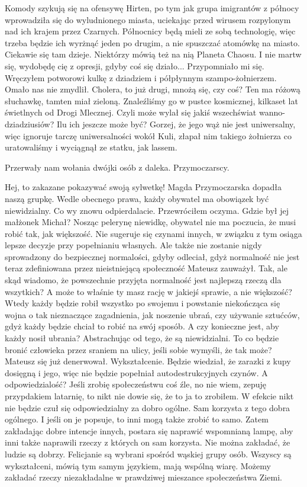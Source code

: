 \begin{dialogue}
Komody szykują się na ofensywę Hirten, po tym jak grupa imigrantów z północy wprowadziła się do wyludnionego miasta, uciekając przed wirusem rozpylonym nad ich krajem przez Czarnych.
Północnicy będą mieli ze sobą technologię, więc trzeba będzie ich wyrżnąć jeden po drugim, a nie spuszczać atomówkę na miasto.
\ds{} Ciekawie się tam dzieje.
\ds{} Niektórzy mówią też na nią Planeta Chaosu. I nie martw się, wydobędę cię z opresji, gdyby coś się działo...
\ds{} Przypomniało mi się. \dm{} Wręczyłem potworowi kulkę z dziadziem i półpłynnym szampo-żołnierzem. \dm{} Omało nas nie zmydlił.
\ds{} Cholera, to już drugi, mnożą się, czy coś?
\ds{} Ten ma różową słuchawkę, tamten miał zieloną. Znaleźliśmy go w pustce kosmicznej, kilkaset lat świetlnych od Drogi Mlecznej.
\ds{} Czyli może wylał się jakiś wszechświat wanno-dziadziusiów? Ilu ich jeszcze może być?
\ds{} Gorzej, że jego wąż nie jest uniwersalny, więc ignoruje tarczę uniwersalności wokół Kuli, złapał nim takiego żołnierza co uratowaliśmy i wyciągnął ze statku, jak lassem.
\end{dialogue}
Przerwały nam wołania dwójki osób z daleka. Przymoczarscy. 
\begin{dialogue}
\ds{} Hej, to zakazane pokazywać swoją sylwetkę! \dm{} Magda Przymoczarska dopadła naszą grupkę. \dm{} Wedle obecnego prawa, każdy obywatel ma obowiązek być niewidzialny.
\ds{} Co wy znowu odpierdalacie. \dm{} Przewróciłem oczyma. Gdzie był jej małżonek Michał?
\ds{} Nosząc pelerynę niewidkę, obywatel nie ma poczucia, że musi robić tak, jak większość. Nie sugeruje się czynami innych, w związku z tym osiąga lepsze decyzje przy popełnianiu własnych.
\ds{} Ale także nie zostanie nigdy sprowadzony do bezpiecznej normalości, gdyby odleciał, gdyż normalność nie jest teraz zdefiniowana przez nieistniejącą społeczność \dm{} Mateusz zauważył.
\ds{} Tak, ale skąd wiadomo, że powszechnie przyjęta normalność jest najlepszą rzeczą dla wszytkich? A może to właśnie ty masz rację w jakiejś sprawie, a nie większość?
\ds{} Wtedy każdy będzie robił wszystko po swojemu i powstanie niekończąca się wojna o tak nieznaczące zagadnienia, jak noszenie ubrań, czy używanie sztućców, gdyż każdy będzie chciał to robić na swój sposób.
\ds{} A czy konieczne jest, aby każdy nosił ubrania? Abstrachując od tego, że są niewidzialni.
\ds{} To co będzie bronić człowieka przez sraniem na ulicy, jeśli sobie wymyśli, że tak może? \dm{} Mateusz się już denerwował.
\ds{} Wykształcenie. Będzie wiedział, że zarazki z kupy dosięgną i jego, więc nie będzie popełniał autodestrukcyjnych czynów.
\ds{} A odpowiedzialość? Jeśli zrobię społeczeństwu coś źle, no nie wiem, zepuję przypdakiem latarnię, to nikt nie dowie się, że to ja to zrobiłem.
W efekcie nikt nie będzie czuł się odpowiedzialny za dobro ogólne.
\ds{} Sam korzysta z tego dobra ogólnego. I jeśli on je popsuje, to inni mogą także zrobić to samo. Zatem zakładając dobre intencje innych, postara się naprawić wspomnianą lampę, aby 
inni także naprawili rzeczy z których on sam korzysta.
\ds{} Nie można zakładać, że ludzie są dobrzy.
\ds{} Felicjanie są wybrani spośród wąskiej grupy osób. Wszyscy są wykształceni, mówią tym samym językiem, mają wspólną wiarę. Możemy zakładać rzeczy niezakładalne w prawdziwej mieszance społeczeństwa Ziemi.
\end{dialogue}
